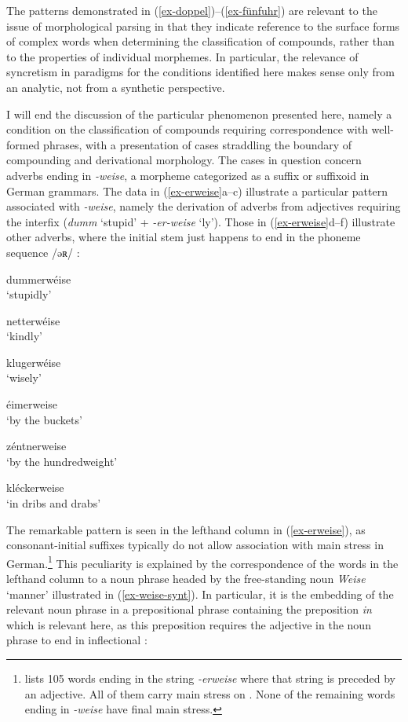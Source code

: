 \documentclass[output=paper
 ,nobabel
 ,draftmode
 ,colorlinks, citecolor=brown
]{langscibook}
\begin{document}
\enlargethispage{-5pt}
\noindent
The patterns demonstrated in (\ref{ex-doppel})--(\ref{ex-fünfuhr}) are relevant to the issue of morphological parsing in that they indicate reference to the surface forms of complex words when determining the classification of compounds, rather than to the properties of individual morphemes. In particular, the relevance of syncretism in paradigms for the conditions identified here makes sense only from an analytic, not from a synthetic perspective.

I will end the discussion of the particular phenomenon presented here, namely a condition on the
classification of compounds requiring correspondence with well-formed phrases, with a presentation
of cases straddling the boundary of compounding and derivational morphology.  The cases in question
concern adverbs ending in \emph{-weise}, a morpheme categorized as a suffix or suffixoid in German
grammars. The data in (\ref{ex-erweise}a--c) illustrate a particular pattern associated with
\emph{-weise}, namely the derivation of adverbs from adjectives requiring the interfix 
(\eg \emph{dumm} `stupid' + \emph{-er-weise} `ly'). Those in (\ref{ex-erweise}d--f) illustrate other
adverbs, where the initial stem just happens to end in the phoneme sequence /əʀ/ :


\begin{multicols}{2}
\eal\label{ex-erweise}
\ex\label{ex-dummerweise}
{dummerwéise}\\
`stupidly'

\ex\label{ex-netterweise}
{netterwéise}\\
`kindly'

\ex\label{ex-klugerweise}
{klugerwéise}\\
`wisely'


%
\columnbreak
%
\ex\label{ex-eimerweise}
{éimerweise}\\
`by the buckets'

\ex\label{ex-zentnerweise}
{zéntnerweise}\\
`by the hundredweight'

\ex\label{ex-kleckerweise}
{kléckerweise}\\
`in dribs and drabs'

\zl
\end{multicols}

\noindent
The remarkable pattern is seen in the lefthand column in (\ref{ex-erweise}), as consonant-initial
suffixes typically do not allow association with main stress in
German.\footnote{\citet{Muthmann1989} lists 105 words ending in the string \emph{-erweise} where
  that string is preceded by an adjective. All of them carry main stress on . None of
  the remaining words ending in \emph{-weise} have final main stress.} This peculiarity is explained
by the correspondence of the words in the lefthand column to a noun phrase headed by the
free-standing noun \emph{Weise} `manner' illustrated in (\ref{ex-weise-synt}). In particular, it is
the embedding of the relevant noun phrase in a prepositional phrase containing the preposition
\emph{in} which is relevant here, as this preposition requires the adjective in the noun phrase to
end in inflectional :  
\end{document}
